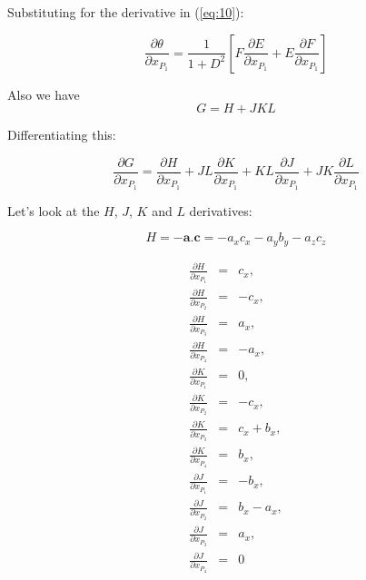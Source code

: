 \documentclass[a4paper,twocolumn,9pt]{article}
\begin{document}
%

Substituting for the derivative in  (\ref{eq:10}):

\begin{displaymath}
  \frac{\partial \theta}{\partial x_{P_1}} = \frac{1}{1+D^2}[F\frac{\partial E}{\partial x_{P_1}} + E\frac{\partial F}{\partial x_{P_1}}]
\end{displaymath}


Also we have
\begin{displaymath}
  G = H + JKL
\end{displaymath}

Differentiating this: 

\begin{displaymath}
  \frac{\partial G}{\partial x_{P_1}} = \frac{\partial H}{\partial x_{P_1}} + JL\frac{\partial K}{\partial x_{P_1}} + KL\frac{\partial J}{\partial x_{P_1}} + JK\frac{\partial L}{\partial x_{P_1}}
\end{displaymath}

Let's look at the $H$, $J$, $K$ and $L$ derivatives:

\begin{displaymath}
    H = -\mathbf{a}.\mathbf{c} = -a_x c_x - a_y b_y - a_z c_z
\end{displaymath}

\begin{eqnarray*}
  \frac{\partial H}{\partial x_{P_1}} & = & c_x,\\
  \frac{\partial H}{\partial x_{P_2}} & = & -c_x,\\
  \frac{\partial H}{\partial x_{P_3}} & = & a_x,\\
  \frac{\partial H}{\partial x_{P_4}} & = & -a_x,\\
  \frac{\partial K}{\partial x_{P_1}} & = & 0,\\
  \frac{\partial K}{\partial x_{P_2}} & = & -c_x,\\
  \frac{\partial K}{\partial x_{P_3}} & = & c_x + b_x,\\
  \frac{\partial K}{\partial x_{P_4}} & = & b_x,\\
  \frac{\partial J}{\partial x_{P_1}} & = & -b_x,\\
  \frac{\partial J}{\partial x_{P_2}} & = & b_x - a_x,\\
  \frac{\partial J}{\partial x_{P_3}} & = & a_x,\\
  \frac{\partial J}{\partial x_{P_4}} & = & 0
\end{eqnarray*}
\end{document}
